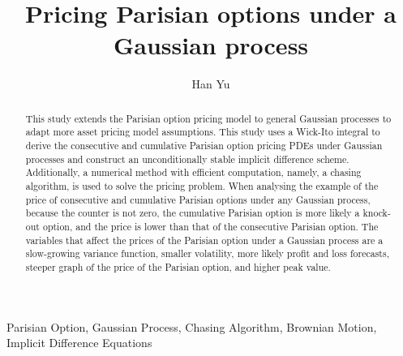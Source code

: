 \documentclass[preprint,12pt]{elsarticle}
\begin{document}
\begin{frontmatter}



\title{Pricing Parisian options under a Gaussian process}


\author{Han Yu}

\address{}

\begin{abstract}
This study extends the Parisian option pricing model to general Gaussian processes to adapt more asset pricing model assumptions. This study uses a Wick-Ito integral to derive the consecutive and cumulative Parisian option pricing PDEs under Gaussian processes and construct an unconditionally stable implicit difference scheme. Additionally, a numerical method with efficient computation, namely, a chasing algorithm, is used to solve the pricing problem. When analysing the example of the price of consecutive and cumulative Parisian options under any Gaussian process, because the counter is not zero, the cumulative Parisian option is more likely a knock-out option, and the price is lower than that of the consecutive Parisian option. The variables that affect the prices of the Parisian option under a Gaussian process are a slow-growing variance function, smaller volatility, more likely profit and loss forecasts, steeper graph of the price of the Parisian option, and higher peak value.
\end{abstract}

\begin{keyword}
Parisian Option, Gaussian Process, Chasing Algorithm, Brownian Motion, Implicit Difference Equations
\end{keyword}

\end{frontmatter}
\end{document}
